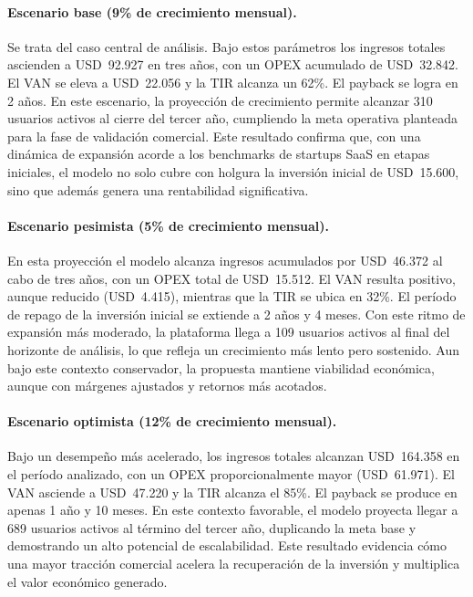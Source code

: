\paragraph{Escenario base (9\% de crecimiento mensual).}  
Se trata del caso central de análisis. Bajo estos parámetros los ingresos totales ascienden a USD~92.927 en tres años, con un OPEX acumulado de USD~32.842. El VAN se eleva a USD~22.056 y la TIR alcanza un 62\%. El payback se logra en 2 años. En este escenario, la proyección de crecimiento permite alcanzar 310 usuarios activos al cierre del tercer año, cumpliendo la meta operativa planteada para la fase de validación comercial. Este resultado confirma que, con una dinámica de expansión acorde a los benchmarks de startups SaaS en etapas iniciales, el modelo no solo cubre con holgura la inversión inicial de USD~15.600, sino que además genera una rentabilidad significativa.

\paragraph{Escenario pesimista (5\% de crecimiento mensual).}  
En esta proyección el modelo alcanza ingresos acumulados por USD~46.372 al cabo de tres años, con un OPEX total de USD~15.512. El VAN resulta positivo, aunque reducido (USD~4.415), mientras que la TIR se ubica en 32\%. El período de repago de la inversión inicial se extiende a 2 años y 4 meses. Con este ritmo de expansión más moderado, la plataforma llega a 109 usuarios activos al final del horizonte de análisis, lo que refleja un crecimiento más lento pero sostenido. Aun bajo este contexto conservador, la propuesta mantiene viabilidad económica, aunque con márgenes ajustados y retornos más acotados.



\paragraph{Escenario optimista (12\% de crecimiento mensual).}  
Bajo un desempeño más acelerado, los ingresos totales alcanzan USD~164.358 en el período analizado, con un OPEX proporcionalmente mayor (USD~61.971). El VAN asciende a USD~47.220 y la TIR alcanza el 85\%. El payback se produce en apenas 1 año y 10 meses. En este contexto favorable, el modelo proyecta llegar a 689 usuarios activos al término del tercer año, duplicando la meta base y demostrando un alto potencial de escalabilidad. Este resultado evidencia cómo una mayor tracción comercial acelera la recuperación de la inversión y multiplica el valor económico generado.

